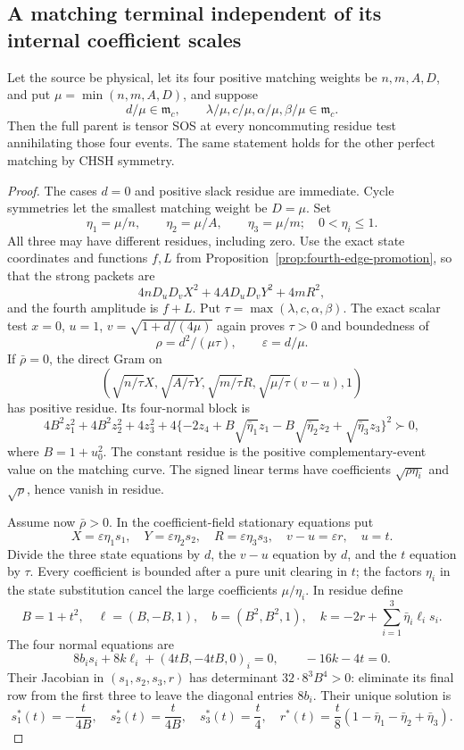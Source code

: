 \subsection{A matching terminal independent of its internal coefficient scales}
\begin{theorem}\label{thm:matching-flag-terminal}
Let the source be physical, let its four positive matching weights be $n,m,A,D$, and put
$\mu=\min(n,m,A,D)$, and suppose
\[
d/\mu\in\mathfrak m_c,\qquad
\lambda/\mu,c/\mu,\alpha/\mu,\beta/\mu\in\mathfrak m_c.
\]
Then the full parent is tensor SOS at every noncommuting residue test annihilating those four events. The same statement holds for the other perfect matching by CHSH symmetry.
\end{theorem}
\begin{proof}
The cases $d=0$ and positive slack residue are immediate. Cycle symmetries let the smallest matching weight be $D=\mu$. Set
\[
\eta_1=\mu/n,\qquad\eta_2=\mu/A,\qquad\eta_3=\mu/m;
\quad 0<\eta_i\le1.
\]
All three may have different residues, including zero. Use the exact state coordinates and functions $f,L$ from Proposition~\ref{prop:fourth-edge-promotion}, so that the strong packets are
\[
4nD_uD_vX^2+4AD_uD_vY^2+4mR^2,
\]
and the fourth amplitude is $f+L$. Put $\tau=\max(\lambda,c,\alpha,\beta)$. The exact scalar test $x=0$, $u=1$, $v=\sqrt{1+d/(4\mu)}$ again proves $\tau>0$ and boundedness of
\[
\rho=d^2/(\mu\tau),\qquad \varepsilon=d/\mu.
\]
If $\bar\rho=0$, the direct Gram on
\[
\left(\sqrt{n/\tau}X,\sqrt{A/\tau}Y,\sqrt{m/\tau}R,
\sqrt{\mu/\tau}(v-u),1\right)
\]
has positive residue. Its four-normal block is
\[
4B^2z_1^2+4B^2z_2^2+4z_3^2+
4\{-2z_4+B\sqrt{\bar\eta_1}z_1
 -B\sqrt{\bar\eta_2}z_2+\sqrt{\bar\eta_3}z_3\}^2\succ0,
\]
where $B=1+u_0^2$. The constant residue is the positive complementary-event value on the matching curve. The signed linear terms have coefficients $\sqrt{\rho\eta_i}$ and $\sqrt\rho$, hence vanish in residue.

Assume now $\bar\rho>0$. In the coefficient-field stationary equations put
\[
X=\varepsilon\eta_1s_1,\quad
Y=\varepsilon\eta_2s_2,\quad
R=\varepsilon\eta_3s_3,\quad
v-u=\varepsilon r,\quad u=t.
\]
Divide the three state equations by $d$, the $v-u$ equation by $d$, and the $t$ equation by $\tau$. Every coefficient is bounded after a pure unit clearing in $t$; the factors $\eta_i$ in the state substitution cancel the large coefficients $\mu/\eta_i$. In residue define
\[
B=1+t^2,\quad \ell=(B,-B,1),\quad
b=(B^2,B^2,1),\quad
k=-2r+\sum_{i=1}^3\bar\eta_i\ell_i s_i.
\]
The four normal equations are
\[
8b_i s_i+8k\ell_i+(4tB,-4tB,0)_i=0,
\qquad -16k-4t=0.
\]
Their Jacobian in $(s_1,s_2,s_3,r)$ has determinant
$32\cdot8^3B^4>0$: eliminate its final row from the first three to leave the diagonal entries $8b_i$. Their unique solution is
\[
s_1^*(t)=-\frac{t}{4B},\quad
s_2^*(t)=\frac{t}{4B},\quad
s_3^*(t)=\frac t4,\quad
r^*(t)=\frac t8(1-\bar\eta_1-\bar\eta_2+\bar\eta_3).
\]


\end{proof}

